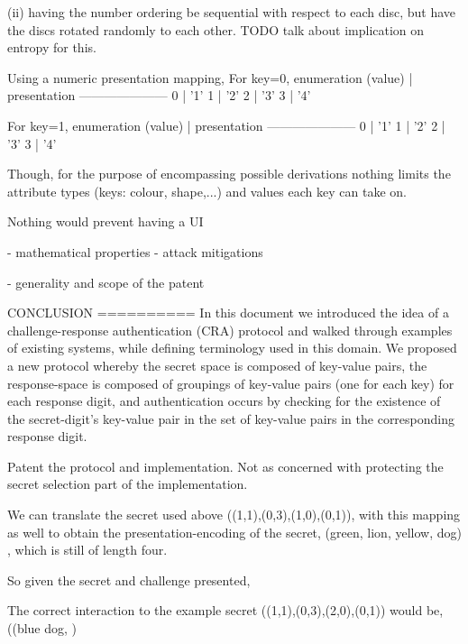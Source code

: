 \documentclass[12pt]{document}
\begin{document}
\begin{Introduction}
  (ii) having the number ordering be sequential with respect to each disc, but have the discs rotated randomly to each other.
    TODO talk about implication on entropy for this.




Using a numeric presentation mapping,
For key=0,
enumeration (value) | presentation
---------------------
0 | '1'
1 | '2'
2 | '3'
3 | '4'


For key=1,
enumeration (value) | presentation
---------------------
0 | '1'
1 | '2'
2 | '3'
3 | '4'










Though, for the purpose of encompassing possible derivations nothing limits the attribute types (keys: colour, shape,...) and values each key can take on.


Nothing would prevent having a UI

- mathematical properties
- attack mitigations

- generality and scope of the patent





CONCLUSION
==========
In this document we introduced the idea of a challenge-response authentication (CRA) protocol and walked through examples of existing systems, while defining terminology used in this domain.
We proposed a new protocol whereby the secret space is composed of key-value pairs, the response-space is composed of groupings of key-value pairs (one for each key) for each response digit, and authentication occurs by checking for the existence of the secret-digit's key-value pair in the set of key-value pairs in the corresponding response digit.

Patent the protocol and implementation.
Not as concerned with protecting the secret selection part of the implementation.


\begin{SCRAP -layman}


We can translate the secret used above ((1,1),(0,3),(1,0),(0,1)), with this mapping as well to obtain the presentation-encoding of the secret, 
(green, lion, yellow, dog)
, which is still of length four.

So given the secret and challenge presented,



The correct interaction to the example secret ((1,1),(0,3),(2,0),(0,1)) would be,
((blue dog,  )




\end{SCRAP -layman}
\end{Introduction}
\end{document}
